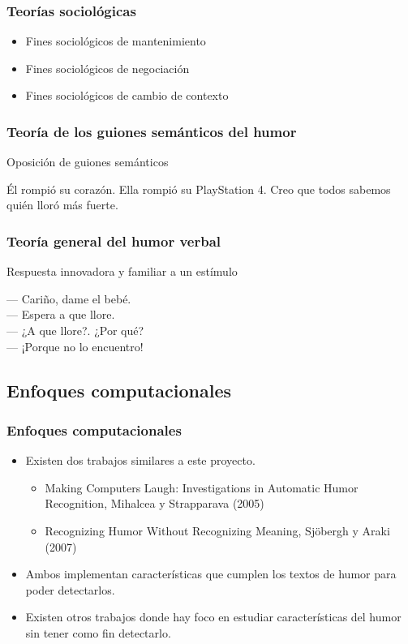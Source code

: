 \begin{frame}
    \frametitle{Teorías sociológicas}

    \begin{itemize}
        \item Fines sociológicos de mantenimiento
        \item Fines sociológicos de negociación
        \item Fines sociológicos de cambio de contexto
    \end{itemize}
\end{frame}

\begin{frame}
    \frametitle{Teoría de los guiones semánticos del humor}

    Oposición de guiones semánticos
    \begin{example}
        Él rompió su corazón. Ella rompió su PlayStation 4. Creo que todos sabemos quién lloró más fuerte.
    \end{example}
\end{frame}

\begin{frame}
    \frametitle{Teoría general del humor verbal}

    Respuesta innovadora y familiar a un estímulo
    \begin{example}
        --- Cariño, dame el bebé. \\
        --- Espera a que llore. \\
        --- ¿A que llore?. ¿Por qué? \\
        --- ¡Porque no lo encuentro! \\
    \end{example}
\end{frame}

\subsection{Enfoques computacionales}
\begin{frame}
    \frametitle{Enfoques computacionales}

    \begin{itemize}
        \item Existen dos trabajos similares a este proyecto.
        \begin{itemize}
            \item Making Computers Laugh: Investigations in Automatic Humor Recognition, Mihalcea y Strapparava (2005)
            \item Recognizing Humor Without Recognizing Meaning, Sjöbergh y Araki (2007)
        \end{itemize}
        \item Ambos implementan características que cumplen los textos de humor para poder detectarlos.
        \item Existen otros trabajos donde hay foco en estudiar características del humor sin tener como fin detectarlo.
    \end{itemize}
\end{frame}

